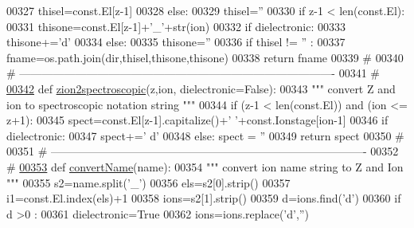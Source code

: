 \begin{DoxyCode}
{{{{00327         thisel=const.El[z-1]
00328     \textcolor{keywordflow}{else}:
00329         thisel=\textcolor{stringliteral}{''}
00330     \textcolor{keywordflow}{if} z-1 < len(const.El):
00331         thisone=const.El[z-1]+\textcolor{stringliteral}{'\_'}+str(ion)
00332         \textcolor{keywordflow}{if} dielectronic:
00333             thisone+=\textcolor{stringliteral}{'d'}
00334     \textcolor{keywordflow}{else}:
00335         thisone=\textcolor{stringliteral}{''}
00336     \textcolor{keywordflow}{if} thisel != \textcolor{stringliteral}{''} :
00337         fname=os.path.join(dir,thisel,thisone,thisone)
00338     \textcolor{keywordflow}{return} fname
00339     \textcolor{comment}{#}
00340     \textcolor{comment}{# -------------------------------------------------------------------------------------}
00341     \textcolor{comment}{#}
\hypertarget{__chianti__tools_8py_source_l00342}{}\hyperlink{namespacepyneb_1_1utils_1_1__chianti__tools_a4c5a7ace6a222c4cfad8f00cf2b68554}{00342} \textcolor{keyword}{def }\hyperlink{namespacepyneb_1_1utils_1_1__chianti__tools_a4c5a7ace6a222c4cfad8f00cf2b68554}{zion2spectroscopic}(z,ion, dielectronic=False):
00343     \textcolor{stringliteral}{""" convert Z and ion to spectroscopic notation string """}
00344     \textcolor{keywordflow}{if} (z-1 < len(const.El)) \textcolor{keywordflow}{and} (ion <= z+1):
00345         spect=const.El[z-1].capitalize()+\textcolor{stringliteral}{' '}+const.Ionstage[ion-1]
00346         \textcolor{keywordflow}{if} dielectronic:
00347             spect+=\textcolor{stringliteral}{' d'}
00348     \textcolor{keywordflow}{else}:  spect = \textcolor{stringliteral}{''}
00349     \textcolor{keywordflow}{return} spect
00350     \textcolor{comment}{#}
00351     \textcolor{comment}{# -------------------------------------------------------------------------------------}
00352     \textcolor{comment}{#}
\hypertarget{__chianti__tools_8py_source_l00353}{}\hyperlink{namespacepyneb_1_1utils_1_1__chianti__tools_a92cf299ad3407ee8923739e2761ab13f}{00353} \textcolor{keyword}{def }\hyperlink{namespacepyneb_1_1utils_1_1__chianti__tools_a92cf299ad3407ee8923739e2761ab13f}{convertName}(name):
00354     \textcolor{stringliteral}{""" convert ion name string to Z and Ion """}
00355     s2=name.split(\textcolor{stringliteral}{'\_'})
00356     els=s2[0].strip()
00357     i1=const.El.index(els)+1
00358     ions=s2[1].strip()
00359     d=ions.find(\textcolor{stringliteral}{'d'})
00360     \textcolor{keywordflow}{if} d >0 :
00361         dielectronic=\textcolor{keyword}{True}
00362         ions=ions.replace(\textcolor{stringliteral}{'d'},\textcolor{stringliteral}{''})
}}}}
\end{DoxyCode}
